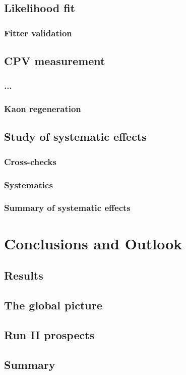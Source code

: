 \section{Likelihood fit}
\subsection{Fitter validation}
\section{CPV measurement}
\subsection{...}
\subsection{Kaon regeneration}
\section{Study of systematic effects}
\subsection{Cross-checks}
\subsection{Systematics}
\subsection{Summary of systematic effects}

\chapter{Conclusions and Outlook}
\section{Results}
\section{The global picture}
\section{Run II prospects}
\section{Summary}
